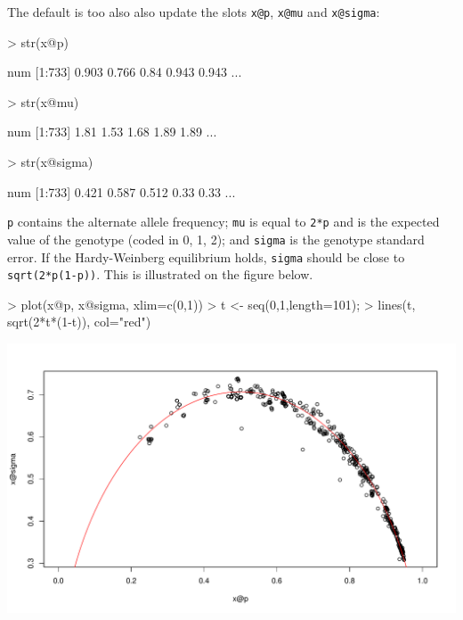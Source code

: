 \documentclass{article}
\renewenvironment{Schunk}{\vspace{\topsep}}{\vspace{\topsep}}
\begin{document}
  The default is too also also update the slots \verb!x@p!, \verb!x@mu! and \verb!x@sigma!:
\begin{Schunk}
\begin{Sinput}
> str(x@p)
\end{Sinput}
\begin{Soutput}
 num [1:733] 0.903 0.766 0.84 0.943 0.943 ...
\end{Soutput}
\begin{Sinput}
> str(x@mu)
\end{Sinput}
\begin{Soutput}
 num [1:733] 1.81 1.53 1.68 1.89 1.89 ...
\end{Soutput}
\begin{Sinput}
> str(x@sigma)
\end{Sinput}
\begin{Soutput}
 num [1:733] 0.421 0.587 0.512 0.33 0.33 ...
\end{Soutput}
\end{Schunk}
  \verb!p! contains the alternate allele frequency; \verb!mu! is equal to \verb!2*p!
  and is the expected value of the genotype (coded in 0, 1, 2); and \verb!sigma!
  is the genotype standard error. If the Hardy-Weinberg equilibrium holds, \verb!sigma!
  should be close to \verb!sqrt(2*p(1-p))!. This is illustrated on the figure below.

\begin{center}
\begin{Schunk}
\begin{Sinput}
> plot(x@p, x@sigma, xlim=c(0,1))
> t <- seq(0,1,length=101);
> lines(t, sqrt(2*t*(1-t)), col="red")
\end{Sinput}
\end{Schunk}
\includegraphics{gaston-017}
\end{center}
\end{document}
